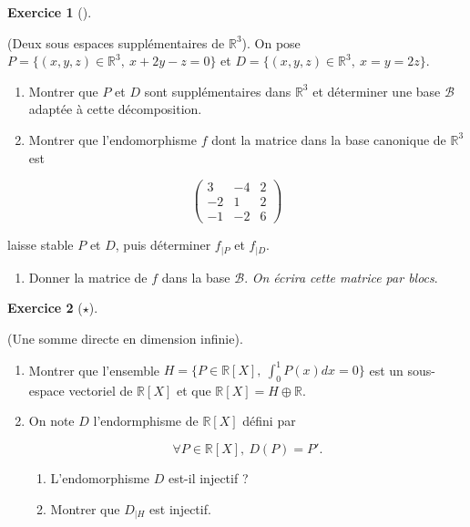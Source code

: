 \documentclass[
  french,
  letterpaper,
  DIV=11,
  numbers=noendperiod]{scrreprt}
\providecommand{\tightlist}{%
  \setlength{\itemsep}{0pt}\setlength{\parskip}{0pt}}
\theoremstyle{plain}
\theoremstyle{definition}
\theoremstyle{plain}
\theoremstyle{plain}
\theoremstyle{definition}
\newtheorem{exercise}{Exercice}[chapter]
\theoremstyle{definition}
\theoremstyle{plain}
\theoremstyle{remark}
\begin{document}
\begin{exercise}[]\protect\hypertarget{exr-03-supp}{}\label{exr-03-supp}

(Deux sous espaces supplémentaires de \(\mathbb{R}^{3}\)). On pose
\(P = \{(x,y,z)\in\mathbb{R}^3,\ x+2y-z=0\}\) et
\(D =\{(x,y,z)\in\mathbb{R}^3,\ x=y=2z\}\).

\begin{enumerate}
\def\labelenumi{\arabic{enumi}.}
\item
  Montrer que \(P\) et \(D\) sont supplémentaires dans \(\mathbb{R}^3\)
  et déterminer une base \(\mathcal{B}\) adaptée à cette décomposition.
\item
  Montrer que l'endomorphisme \(f\) dont la matrice dans la base
  canonique de \(\mathbb{R}^{3}\) est
\end{enumerate}

\[
\begin{pmatrix}
    3&-4&2\\
    -2&1&2\\
    -1&-2&6
\end{pmatrix}    
\]

laisse stable \(P\) et \(D\), puis déterminer \(f_{|P}\) et \(f_{|D}\).

\begin{enumerate}
\def\labelenumi{\arabic{enumi}.}
\setcounter{enumi}{2}
\tightlist
\item
  Donner la matrice de \(f\) dans la base \(\mathcal{B}\). \emph{On
  écrira cette matrice par blocs}.
\end{enumerate}

\end{exercise}

\begin{exercise}[\(\star\)]\protect\hypertarget{exr-03-an-synt-1}{}\label{exr-03-an-synt-1}

(Une somme directe en dimension infinie).

\begin{enumerate}
\def\labelenumi{\arabic{enumi}.}
\item
  Montrer que l'ensemble \(H=\{P\in\mathbb{R}[X],\ \int_0^1P(x)dx=0\}\)
  est un sous-espace vectoriel de \(\mathbb{R}[X]\) et que
  \(\mathbb{R}[X] = H\oplus\mathbb{R}\).
\item
  On note \(D\) l'endormphisme de \(\mathbb{R}[X]\) défini par

  \[
  \forall P \in \mathbb{R}[X],\ D(P)=P'.
  \]

  \begin{enumerate}
  \def\labelenumii{\alph{enumii}.}
  \item
    L'endomorphisme \(D\) est-il injectif ?
  \item
    Montrer que \(D_{|H}\) est injectif.
  \end{enumerate}
\end{enumerate}

\end{exercise}
\end{document}
